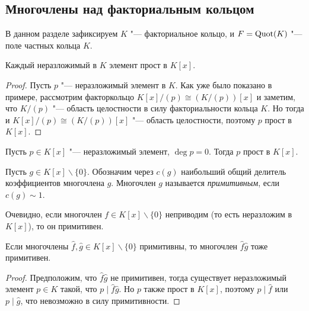 \subsection{Многочлены над факториальным кольцом}

В данном разделе зафиксируем $K$ "--- факториальное кольцо, и $F = \operatorname{Quot}(K)$ "--- поле частных кольца $K$.

\begin{proposition}
	Каждый неразложимый в $K$ элемент прост в $K[x]$.
\end{proposition}

\begin{proof}
	Пусть $p$ "--- неразложимый элемент в $K$. Как уже было показано в примере, рассмотрим факторкольцо $K[x] / (p) \cong (K / (p))[x]$ и заметим, что $K / (p)$ "--- область целостности в силу факториальности кольца $K$. Но тогда и $K[x] / (p) \cong (K / (p))[x]$ "--- область целостности, поэтому $p$ прост в $K[x]$.
\end{proof}

\begin{corollary}
	Пусть $p \in K[x]$ "--- неразложимый элемент, $\deg{p} = 0$. Тогда $p$ прост в $K[x]$.
\end{corollary}

\begin{definition}
	Пусть $g \in K[x] \backslash \{0\}$. Обозначим через $c(g)$ наибольший общий делитель коэффициентов многочлена $g$. Многочлен $g$ называется \textit{примитивным}, если $c(g) \sim 1$.
\end{definition}

\begin{note}
	Очевидно, если многочлен $f \in K[x] \backslash \{0\}$ неприводим (то есть неразложим в $K[x]$), то он примитивен.
\end{note}

\begin{proposition}
	Если многочлены $\widehat{f}, \widehat{g} \in K[x] \backslash \{0\}$ примитивны, то многочлен $\widehat{f}\widehat{g}$ тоже примитивен.
\end{proposition}

\begin{proof}
	Предположим, что $\widehat{f}\widehat{g}$ не примитивен, тогда существует неразложимый элемент $p \in K$ такой, что $p \mid \widehat{f}\widehat{g}$. Но $p$ также прост в $K[x]$, поэтому $p \mid \widehat{f}$ или $p \mid \widehat{g}$, что невозможно в силу примитивности.
\end{proof}

